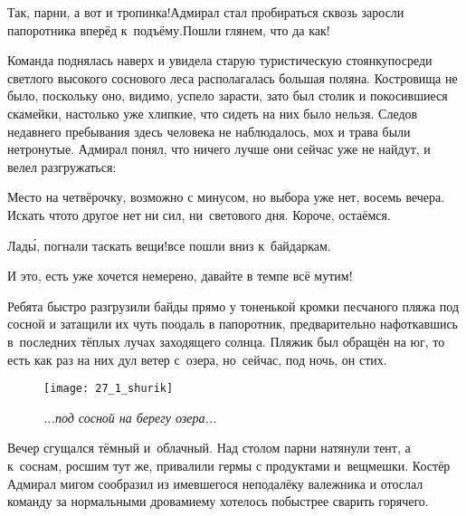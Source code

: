 \diagdash Так, парни, а вот и тропинка!\mdash Адмирал стал пробираться сквозь заросли папоротника вперёд к~подъёму.\mdash Пошли глянем, что да как!

Команда поднялась наверх и увидела старую туристическую стоянку\mdash посреди светлого высокого соснового леса располагалась большая поляна. Костровища не было, поскольку оно, видимо, успело зарасти, зато был столик и покосившиеся скамейки, настолько уже хлипкие, что сидеть на них было нельзя. Следов недавнего пребывания здесь человека не наблюдалось, мох и трава были нетронутые. Адмирал понял, что ничего лучше они сейчас уже не найдут, и велел разгружаться:

\diagdash Место на четвёрочку, возможно с минусом, но выбора уже нет, восемь вечера. Искать что\sdash то другое нет ни сил, ни~светового дня. Короче, остаёмся.

\diagdash Лад\'{ы}, погнали таскать вещи!\mdash все пошли вниз к~байдаркам.

\diagdash И это, есть уже хочется немерено, давайте в темпе всё мутим!

Ребята быстро разгрузили байды прямо у тоненькой кромки песчаного пляжа под сосной и затащили их чуть поодаль в папоротник, предварительно нафоткавшись в~последних тёплых лучах заходящего солнца. Пляжик был обращён на юг, то есть как раз на них дул ветер с~озера, но~сейчас, под ночь, он стих.

\begin{wrapfigure}[23]{l}{0.6\textwidth}
	\centering
	\texttt{[image: 27\_1\_shurik]}
	\caption{\small\textit{...под сосной на берегу озера...}}
\end{wrapfigure}

Вечер сгущался тёмный и~облачный. 
Над столом парни натянули тент, а к~соснам, росшим тут же, привалили гермы с продуктами и~вещмешки. 
Костёр Адмирал мигом сообразил из имевшегося неподалёку валежника и отослал команду за нормальными дровами\mdash ему хотелось побыстрее сварить горячего.

